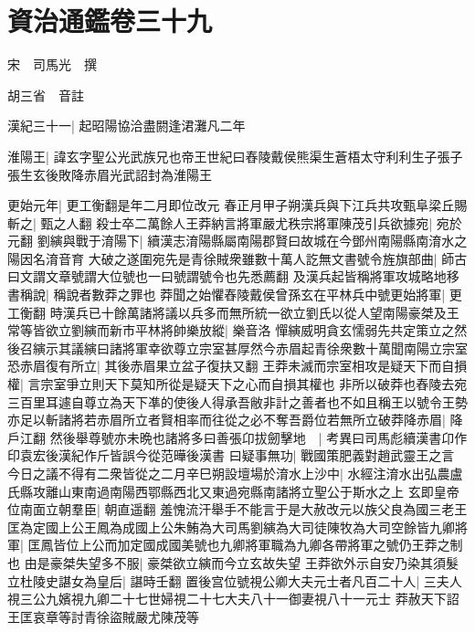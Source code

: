 \section{資治通鑑卷三十九}
宋　司馬光　撰

胡三省　音註

漢紀三十一|{
	起昭陽協洽盡閼逢涒灘凡二年}


淮陽王|{
	諱玄字聖公光武族兄也帝王世紀曰舂陵戴侯熊渠生蒼梧太守利利生子張子張生玄後敗降赤眉光武詔封為淮陽王}


更始元年|{
	更工衡翻是年二月即位改元}
春正月甲子朔漢兵與下江兵共攻甄阜梁丘賜斬之|{
	甄之人翻}
殺士卒二萬餘人王莽納言將軍嚴尤秩宗將軍陳茂引兵欲據宛|{
	宛於元翻}
劉縯與戰于淯陽下|{
	續漢志淯陽縣屬南陽郡賢曰故城在今鄧州南陽縣南淯水之陽因名淯音育}
大破之遂圍宛先是青徐賊衆雖數十萬人訖無文書號令旌旗部曲|{
	師古曰文謂文章號謂大位號也一曰號謂號令也先悉薦翻}
及漢兵起皆稱將軍攻城略地移書稱說|{
	稱說者數莽之罪也}
莽聞之始懼舂陵戴侯曾孫玄在平林兵中號更始將軍|{
	更工衡翻}
時漢兵已十餘萬諸將議以兵多而無所統一欲立劉氏以從人望南陽豪桀及王常等皆欲立劉縯而新市平林將帥樂放縱|{
	樂音洛}
憚縯威明貪玄懦弱先共定策立之然後召縯示其議縯曰諸將軍幸欲尊立宗室甚厚然今赤眉起青徐衆數十萬聞南陽立宗室恐赤眉復有所立|{
	其後赤眉果立盆子復扶又翻}
王莽未滅而宗室相攻是疑天下而自損權|{
	言宗室爭立則天下莫知所從是疑天下之心而自損其權也}
非所以破莽也舂陵去宛三百里耳遽自尊立為天下凖的使後人得承吾敝非計之善者也不如且稱王以號令王勢亦足以斬諸將若赤眉所立者賢相率而往從之必不奪吾爵位若無所立破莽降赤眉|{
	降戶江翻}
然後舉尊號亦未晩也諸將多曰善張卬拔劒擊地　|{
	考異曰司馬彪續漢書卬作印袁宏後漢紀作斤皆誤今從范曄後漢書}
曰疑事無功|{
	戰國策肥義對趙武靈王之言}
今日之議不得有二衆皆從之二月辛巳朔設壇場於淯水上沙中|{
	水經注淯水出弘農盧氏縣攻離山東南過南陽西鄂縣西北又東過宛縣南諸將立聖公于斯水之上}
玄即皇帝位南面立朝羣臣|{
	朝直遥翻}
羞愧流汗舉手不能言于是大赦改元以族父良為國三老王匡為定國上公王鳳為成國上公朱鮪為大司馬劉縯為大司徒陳牧為大司空餘皆九卿將軍|{
	匡鳳皆位上公而加定國成國美號也九卿將軍職為九卿各帶將軍之號仍王莽之制也}
由是豪桀失望多不服|{
	豪桀欲立縯而今立玄故失望}
王莽欲外示自安乃染其須髮立杜陵史諶女為皇后|{
	諶時壬翻}
置後宫位號視公卿大夫元士者凡百二十人|{
	三夫人視三公九嬪視九卿二十七世婦視二十七大夫八十一御妻視八十一元士}
莽赦天下詔王匡哀章等討青徐盜賊嚴尤陳茂等

